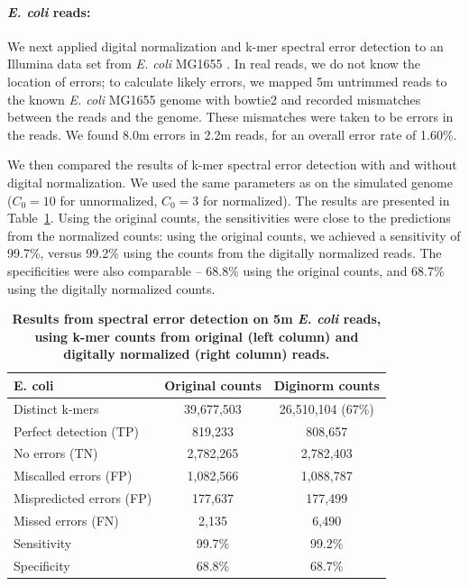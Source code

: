 \documentclass{article}
\begin{document}

\paragraph{{\em E. coli} reads:}
We next applied digital normalization and k-mer spectral error
detection to an Illumina data set from {\em E. coli} MG1655
\cite{pubmed21926975}.  In real reads, we do not know the location of
errors; to calculate likely errors, we mapped 5m untrimmed reads to
the known {\em E. coli} MG1655 genome with bowtie2 \cite{bowtie2} and
recorded mismatches between the reads and the genome.  These
mismatches were taken to be errors in the reads.  We found 8.0m errors
in 2.2m reads, for an overall error rate of 1.60\%.

We then compared the results of k-mer spectral error detection with
and without digital normalization.  We used the same parameters as on
the simulated genome ($C_0=10$ for unnormalized, $C_0=3$ for
normalized).  The results are presented in
Table~\ref{tab:ecoli_dn_counts}. Using the original counts, the
sensitivities were close to the predictions from the normalized
counts: using the original counts, we achieved a sensitivity of
99.7\%, versus 99.2\% using the counts from the digitally normalized
reads.  The specificities were also comparable -- 68.8\% using the original
counts, and 68.7\% using the digitally normalized counts.


\begin{table}
\centering
\begin{tabular}{|l|c|c|}
\hline
{\bf E. coli} & Original counts & Diginorm counts \\
\hline
Distinct k-mers         & 39,677,503 & 26,510,104 (67\%) \\
\hline
Perfect detection (TP)  & 819,233   & 808,657 \\
No errors (TN)          & 2,782,265 & 2,782,403 \\
Miscalled errors (FP)   & 1,082,566 & 1,088,787 \\
Mispredicted errors (FP)& 177,637       & 177,499   \\
Missed errors (FN)      & 2,135     & 6,490    \\
\hline
Sensitivity & 99.7\% & 99.2\% \\
Specificity & 68.8\% & 68.7\% \\
\hline
\end{tabular}


\caption{{\bf Results from spectral error detection on 5m {\em
      E. coli} reads, using k-mer counts from original (left column)
    and digitally normalized (right column) reads.}}

\label{tab:ecoli_dn_counts}
\end{table}
\end{document}
